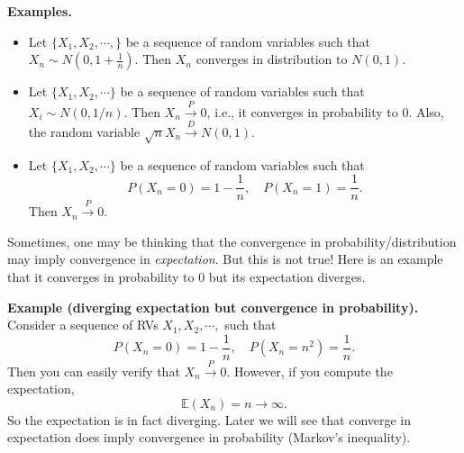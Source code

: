 \documentclass[twoside]{article}
\newcommand\E{\mathbb{E}}
\begin{document}
{\bf Examples.}
\begin{itemize}
\item Let $\{X_1,X_2,\cdots, \}$ be a sequence of random variables such that
$X_n\sim N\left(0, 1+\frac{1}{n}\right)$.
Then $X_n$ converges in distribution to $N(0,1)$. 

\item Let $\{X_1,X_2,\cdots\}$ be a sequence of  random variables such that $X_i \sim N(0, 1/n)$.
Then $X_n\overset{P}{\rightarrow}0$, i.e., it converges in probability to $0$. 
Also, 
the random variable $\sqrt{n} X_n \overset{D}{\rightarrow} N(0,1)$.


\item Let $\{X_1,X_2,\cdots\}$ be a sequence of  random variables such that 
$$
P(X_n =0) =1-\frac{1}{n},\quad P(X_n = 1) = \frac{1}{n}.
$$
Then $X_n\overset{P}{\rightarrow}0$.






\end{itemize}


Sometimes, one may be thinking that the convergence in probability/distribution may imply convergence in \emph{expectation}.
But this is not true!
Here is an example that it converges in probability to $0$ but its expectation diverges. 

{\bf Example (diverging expectation but convergence in probability). }
Consider a sequence of RVs $X_1,X_2,\cdots, $ such that
$$
P(X_n =0) =1-\frac{1}{n},\quad P(X_n = n^2) = \frac{1}{n}.
$$
Then you can easily verify that  $X_n\overset{P}{\rightarrow}0$.
However, if you compute the expectation, 
$$
\E(X_n) = n \rightarrow \infty.
$$
So the expectation is in fact diverging. 
Later we will see that converge in expectation does imply convergence in probability (Markov's inequality).
\end{document}
